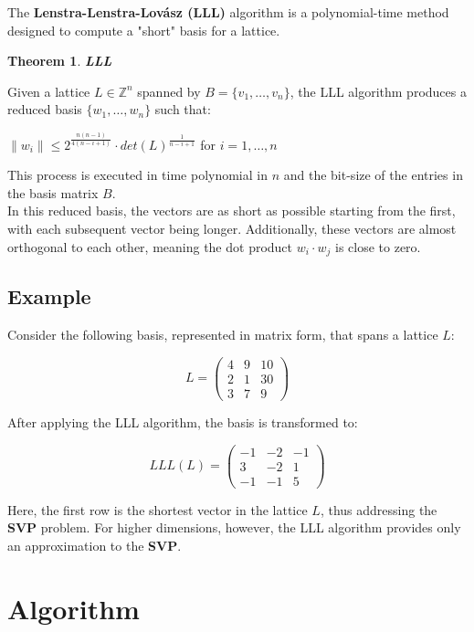 \documentclass[a4paper,12pt]{report}
\newtheorem{theorem}{Theorem}[section]
\newcommand{\Z}{\mathbb{Z}}
\begin{document}
The \textbf{Lenstra-Lenstra-Lovász (LLL)} algorithm is a polynomial-time method designed to compute a "short" basis for a lattice.

\begin{theorem}
    \textbf{LLL}
\end{theorem}

Given a lattice $L \in \Z^n$ spanned by $B = \{v_1,\ldots,v_n\}$, the LLL algorithm produces a reduced basis $\{w_1, \ldots, w_n\}$ such that:

\begin{center}
    $\lVert w_i \rVert \le 2^{\frac{n(n-1)}{4(n-i+1)}} \cdot det(L)^{\frac{1}{n-i+1}}$ for $i=1,\ldots,n$
\end{center}

This process is executed in time polynomial in $n$ and the bit-size of the entries in the basis matrix $B$.\\

In this reduced basis, the vectors are as short as possible starting from the first, with each subsequent vector being longer. Additionally, these vectors are almost orthogonal to each other, meaning the dot product $w_i \cdot w_j$ is close to zero.

\subsection*{Example}

Consider the following basis, represented in matrix form, that spans a lattice $L$:

\[
L = 
\begin{pmatrix}
    4 & 9 & 10\\
    2 & 1 & 30\\ 
    3 & 7 & 9
\end{pmatrix}
\] 

After applying the LLL algorithm, the basis is transformed to:

\[
LLL(L) = 
\begin{pmatrix}
    -1 & -2 & -1\\
     3 & -2 &  1\\
    -1 & -1 &  5
\end{pmatrix}
\] 

Here, the first row is the shortest vector in the lattice $L$, thus addressing the \textbf{SVP} problem. For higher dimensions, however, the LLL algorithm provides only an approximation to the \textbf{SVP}.

\section{Algorithm}
\end{document}
